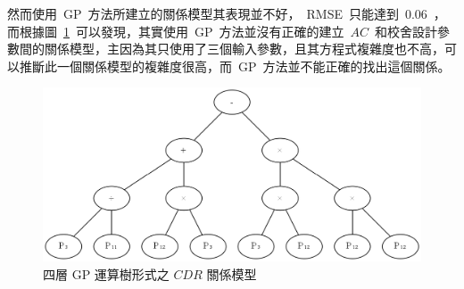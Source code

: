 
然而使用~GP~方法所建立的關係模型其表現並不好，~RMSE~只能達到~0.06~，而根據圖~\ref{fig:4LGP}~可以發現，其實使用~GP~方法並沒有正確的建立~$AC$~和校舍設計參數間的關係模型，主因為其只使用了三個輸入參數，且其方程式複雜度也不高，可以推斷此一個關係模型的複雜度很高，而~GP~方法並不能正確的找出這個關係。

\begin{figure}[!hbtp]
  \begin{center}
    \includegraphics[width=1.0\textwidth]{figures/4-layer-gp.png}
    \caption{四層 GP 運算樹形式之 $CDR$ 關係模型} 
    \label{fig:4LGP}
  \end{center}
\end{figure}



